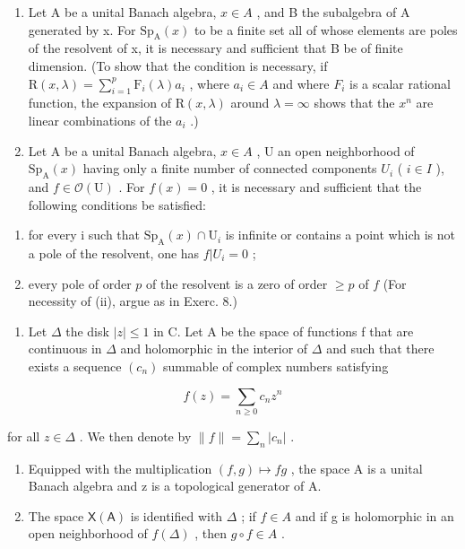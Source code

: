 \begin{enumerate}
\def\labelenumi{\arabic{enumi})}
\setcounter{enumi}{7}
\item
  Let A be a unital Banach algebra, \(x \in A\) , and B the subalgebra of A generated by x. For \(\mathrm{Sp}_{\mathrm{A}}(x)\) to be a finite set all of whose elements are poles of the resolvent of x, it is necessary and sufficient that B be of finite dimension. (To show that the condition is necessary, if \(\mathrm{R}(x, \lambda) = \sum_{i=1}^{p} \mathrm{F}_{i}(\lambda) a_{i}\) , where \(a_{i} \in A\) and where \(F_{i}\) is a scalar rational function, the expansion of \(\mathrm{R}(x, \lambda)\) around \(\lambda = \infty\) shows that the \(x^{n}\) are linear combinations of the \(a_{i}\) .)
\item
  Let A be a unital Banach algebra, \(x \in A\) , U an open neighborhood of \(\mathrm{Sp}_{\mathrm{A}}(x)\) having only a finite number of connected components \(U_{i}\) ( \(i \in I\) ), and \(f \in \mathcal{O}(\mathrm{U})\) . For \(f(x) = 0\) , it is necessary and sufficient that the following conditions be satisfied:
\end{enumerate}

\begin{enumerate}
\def\labelenumi{(\roman{enumi})}
\item
  for every i such that \(\mathrm{Sp}_{\mathrm{A}}(x)\cap\mathrm{U}_{i}\) is infinite or contains a point which is not a pole of the resolvent, one has \(f|U_{i}=0\) ;
\item
  every pole of order \(p\) of the resolvent is a zero of order \(\geqslant p\) of \(f\) (For necessity of (ii), argue as in Exerc. 8.)
\end{enumerate}

\begin{enumerate}
\def\labelenumi{\arabic{enumi})}
\setcounter{enumi}{9}
\tightlist
\item
  Let \(\Delta\) the disk \(|z| \leqslant 1\) in C. Let A be the space of functions f that are continuous in \(\Delta\) and holomorphic in the interior of \(\Delta\) and such that there exists a sequence \((c_{n})\) summable of complex numbers satisfying
\end{enumerate}

\[
f (z) = \sum_ {n \geqslant 0} c _ {n} z ^ {n}
\]

for all \(z \in \Delta\) . We then denote by \(\|f\| = \sum_{n}|c_{n}|\) .

\begin{enumerate}
\def\labelenumi{\alph{enumi})}
\item
  Equipped with the multiplication \((f,g)\mapsto fg\) , the space A is a unital Banach algebra and z is a topological generator of A.
\item
  The space \(\mathsf{X}(\mathsf{A})\) is identified with \(\Delta\) ; if \(f \in A\) and if g is holomorphic in an open neighborhood of \(f(\Delta)\) , then \(g \circ f \in A\) .
\end{enumerate}

